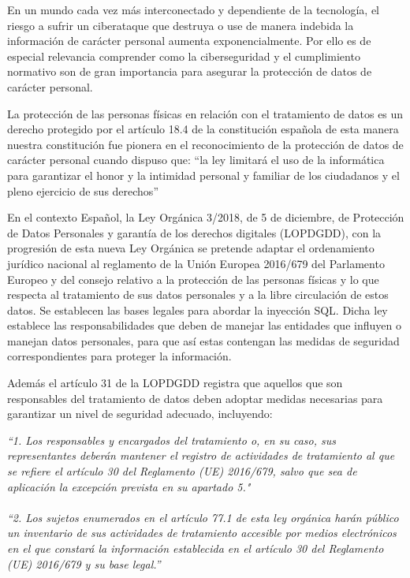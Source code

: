 \documentclass[11pt]{report}
\begin{document}
En un mundo cada vez más interconectado y dependiente de la tecnología, el riesgo a sufrir un ciberataque que destruya o use de manera indebida
la información de carácter personal aumenta exponencialmente. Por ello es de especial relevancia comprender como la ciberseguridad y el cumplimiento
normativo son de gran importancia para asegurar la protección de datos de carácter personal.

La protección de las personas físicas en relación con el tratamiento de datos es un derecho protegido por el artículo 18.4 de la constitución 
española de esta manera nuestra constitución fue pionera en el reconocimiento de la protección de datos de carácter personal cuando dispuso que: 
“la ley limitará el uso de la informática para garantizar el honor y la intimidad personal y familiar de los ciudadanos y el pleno ejercicio de sus derechos”

En el contexto Español, la Ley Orgánica 3/2018, de 5 de diciembre, de Protección de Datos Personales y garantía de los derechos digitales (LOPDGDD), 
con la progresión de esta nueva Ley Orgánica se pretende adaptar el ordenamiento jurídico nacional al reglamento de la Unión Europea 2016/679 del 
Parlamento Europeo y del consejo relativo a la protección de las personas físicas y lo que respecta al tratamiento de sus datos personales y a la 
libre circulación de estos datos. Se establecen las bases legales para abordar la inyección SQL. Dicha ley establece las responsabilidades que deben
de manejar las entidades que influyen o manejan datos personales, para que así estas contengan las medidas de seguridad correspondientes para proteger la información.

Además el artículo 31 de la LOPDGDD registra que aquellos que son responsables del tratamiento de datos deben adoptar medidas necesarias para garantizar
un nivel de seguridad adecuado, incluyendo:

\emph{“1. Los responsables y encargados del tratamiento o, en su caso, sus representantes deberán mantener el registro de actividades de tratamiento al que se refiere el 
artículo 30 del Reglamento (UE) 2016/679, salvo que sea de aplicación la excepción prevista en su apartado 5."}
\\ \\
\emph{“2. Los sujetos enumerados en el artículo 77.1 de esta ley orgánica harán público un inventario de sus actividades de tratamiento accesible por medios electrónicos
en el que constará la información establecida en el artículo 30 del Reglamento (UE) 2016/679 y su base legal.”}
\end{document}
